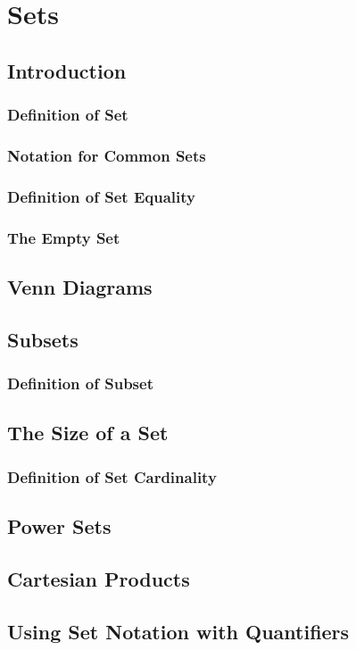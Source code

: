 \documentclass[11pt]{book}
\begin{document}
 \section{Sets}
  \subsection{Introduction}
   \subsubsection{Definition of Set}
   \subsubsection{Notation for Common Sets}
   \subsubsection{Definition of Set Equality}
   \subsubsection{The Empty Set}
  \subsection{Venn Diagrams}
  \subsection{Subsets}
   \subsubsection{Definition of Subset}
  \subsection{The Size of a Set}
   \subsubsection{Definition of Set Cardinality}
  \subsection{Power Sets}
  \subsection{Cartesian Products}
  \subsection{Using Set Notation with Quantifiers}
\end{document}

